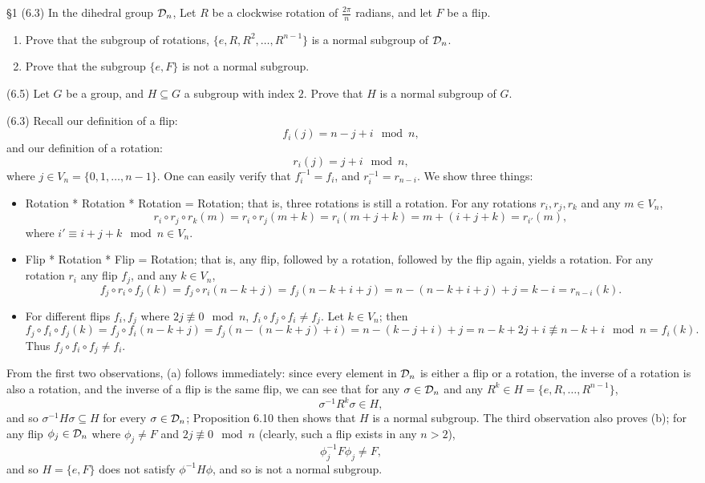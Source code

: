 \documentclass{homework}
\begin{document}
\begin{problem}{\S 1}
  (6.3) In the dihedral group $\mathcal{D}_n$, Let $R$ be a clockwise rotation of $\frac{2\pi}{n}$ radians,
  and let $F$ be a flip.
  \begin{enumerate}[label=(\alph*)]
    \item Prove that the subgroup of rotations, $\{ e,R,R^2,\ldots,R^{n-1} \}$ is a normal subgroup
      of $\mathcal{D}_n$.
    \item Prove that the subgroup $\{ e,F \}$ is not a normal subgroup.
  \end{enumerate}

  (6.5) Let $G$ be a group, and $H\subseteq G$ a subgroup with index $2$. Prove that $H$ is a normal
  subgroup of $G$.
\end{problem}

\begin{solution}

  (6.3) Recall our definition of a flip: \[
    f_i(j)=n-j+i\mod{n}
  ,\] and our definition of a rotation: \[
    r_i(j)=j+i\mod{n}
  ,\] where $j\in V_n=\{ 0,1,\ldots,n-1 \}$. One can easily verify that $f_i^{-1}=f_i$, and
  $r_i^{-1}=r_{n-i}$. We show three things:
  \begin{itemize}
    \item Rotation * Rotation * Rotation = Rotation; that is, three rotations is still a rotation.
      For any rotations $r_i,r_j,r_k$ and any $m\in V_n$, \[
        r_i\circ r_j\circ r_k(m)=r_i\circ r_j(m+k)=r_i(m+j+k)=m+(i+j+k)=r_{i'}(m)
      ,\] where $i'\equiv i+j+k\mod{n}\in V_n$.
    \item Flip * Rotation * Flip = Rotation; that is, any flip, followed by a rotation, followed by
      the flip again, yields a rotation. For any rotation $r_i$ any flip $f_j$, and any $k\in V_n$,
      \[
        f_j\circ r_i\circ f_j(k)=f_j\circ r_i(n-k+j)=f_j(n-k+i+j)=n-(n-k+i+j)+j=k-i=r_{n-i}(k)
      .\] 
    \item For different flips $f_i,f_j$ where $2j\not\equiv 0\mod{n}$, $f_i\circ f_j\circ f_i\neq
      f_j$. Let $k\in V_n$; then \[
        f_j\circ f_i\circ f_j(k)=f_j\circ
        f_i(n-k+j)=f_j(n-(n-k+j)+i)=n-(k-j+i)+j=n-k+2j+i\not\equiv n-k+i\mod{n}=f_i(k)
    .\] Thus $f_j\circ f_i\circ f_j\neq f_i$.
  \end{itemize}

  From the first two observations, (a) follows immediately: since every element in $\mathcal{D}_n$ is either
  a flip or a rotation, the inverse of a rotation is also a rotation, and the inverse of a flip is
  the same flip, we can see that for any $\sigma\in \mathcal{D}_n$ and any $R^k\in H=\{ e,R,\ldots,R^{n-1}
  \}$, \[
    \sigma^{-1}R^k\sigma\in H
  ,\] and so $\sigma^{-1}H\sigma\subseteq H$ for every $\sigma\in \mathcal{D}_n$; Proposition 6.10 then shows
  that $H$ is a normal subgroup. The third observation also proves (b); for any flip $\phi_j\in \mathcal{D}_n$ where $\phi_j\neq F$ and
  $2j\not\equiv 0\mod{n}$ (clearly, such a flip exists in any $n>2$), \[
    \phi_j^{-1}F\phi_j\neq F
  ,\] and so $H=\{ e,F \}$ does not satisfy $\phi^{-1}H\phi$, and so is not a normal subgroup. \\


\end{solution}
\end{document}
